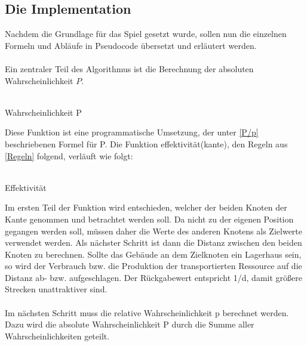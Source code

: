 \documentclass[12pt]{article}
\begin{document}
\subsection{Die Implementation}\label{pseudo}
Nachdem die Grundlage für das Spiel gesetzt wurde, sollen nun die einzelnen Formeln und Abläufe in Pseudocode übersetzt und erläutert werden. \\\\
Ein zentraler Teil des Algorithmus ist die Berechnung der absoluten Wahrscheinlichkeit $P$. \\\\
\begin{algorithm}[H]
 \caption{Wahrscheinlichkeit P}
 \DontPrintSemicolon

\end{algorithm}Diese Funktion ist eine programmatische Umsetzung, der unter \ref{P/p} beschriebenen Formel für P.
Die Funktion effektivität(kante), den Regeln aus \ref{Regeln}  folgend, verläuft wie folgt:\\\\
\begin{algorithm}[H]
\caption{Effektivität}
\DontPrintSemicolon
{}
\end{algorithm}Im ersten Teil der Funktion wird entschieden, welcher der beiden Knoten der Kante genommen und betrachtet werden soll. Da nicht zu der eigenen Position gegangen werden soll, müssen daher die Werte des anderen Knotens als Zielwerte verwendet werden. Als nächster Schritt ist dann die Distanz zwischen den beiden Knoten zu berechnen. Sollte das Gebäude an dem Zielknoten ein Lagerhaus sein, so wird der Verbrauch bzw. die Produktion der transportierten Ressource auf die Distanz ab- bzw. aufgeschlagen. 
Der Rückgabewert entspricht 1/d, damit größere Strecken unattraktiver sind.\\\\
Im nächsten Schritt muss die relative Wahrscheinlichkeit p berechnet werden. Dazu wird die absolute Wahrscheinlichkeit P durch die Summe aller Wahrscheinlichkeiten geteilt.\\\\
\end{document}
